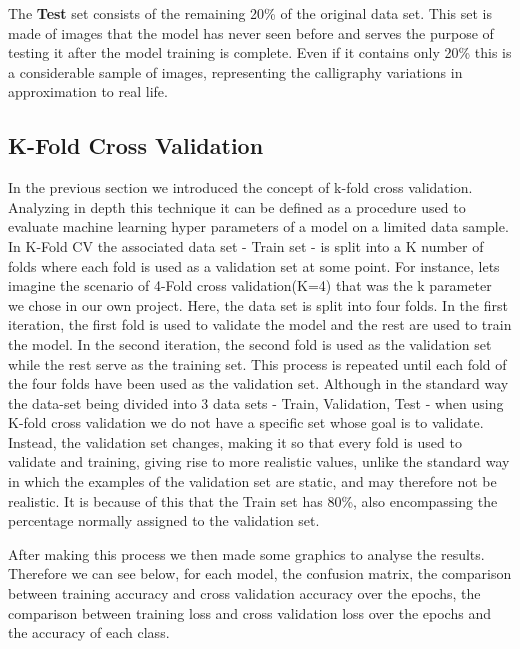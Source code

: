 \documentclass[conference]{IEEEtran}
\begin{document}
The \textbf{Test} set consists of the remaining 20\% of the original data set. This set is made of images that the model has never seen before and serves the purpose of testing it after the model training is complete. Even if it contains only 20\% this is a considerable sample of images, representing the calligraphy variations in approximation to real life.

\subsection{K-Fold Cross Validation \cite{A} \cite{E}}
In the previous section we introduced the concept of k-fold cross validation. Analyzing in depth this technique it can be defined as a procedure used to evaluate machine learning hyper parameters of a model on a limited data sample. In K-Fold CV the associated data set - Train set - is split into a K number of folds where each fold is used as a validation set at some point. For instance, lets imagine the scenario of 4-Fold cross validation(K=4) that was the k parameter we chose in our own project. Here, the data set is split into four folds. In the first iteration, the first fold is used to validate the model and the rest are used to train the model. In the second iteration, the second fold is used as the validation set while the rest serve as the training set. This process is repeated until each fold of the four folds have been used as the validation set. Although in the standard way the data-set being divided into 3 data sets - Train, Validation, Test - when using K-fold cross validation we do not have a specific set whose goal is to validate. Instead, the validation set changes, making it so that every fold is used to validate and training, giving rise to more realistic values, unlike the standard way in which the examples of the validation set are static, and may therefore not be realistic. It is because of this that the Train set has 80\%, also encompassing the percentage normally assigned to the validation set.

After making this process we then made some graphics to analyse the results. Therefore we can see below, for each model, the confusion matrix, the comparison between training accuracy and cross validation accuracy over the epochs, the comparison between training loss and cross validation loss over the epochs and the accuracy of each class.
\end{document}
